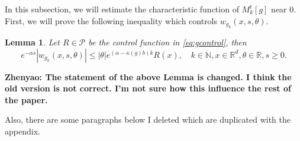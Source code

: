 \documentclass[12pt, a4paper]{amsart}
\newtheorem{lem}[thm]{Lemma}
\theoremstyle{definition}
\numberwithin{equation}{section}
\begin{document}
In this subsection, we will estimate the characteristic function of $M_k^t[g]$ near $0$. First, we will prove the following inequality which controls $w_{g_k}(x,s,\theta)$.
\begin{lem}\label{lemma1}
    Let $R \in \mathcal P$ be the control function in \eqref{eq:gcontrol}, then
\begin{equation}
    e^{-\alpha s}|w_{g_k}(x,s,\theta)|
    \leq |\theta|e^{(\alpha-\kappa(g)b)k} R(x), 
    \quad k\in \mathbb N, x\in \mathbb R^d, \theta \in \mathbb R, s\geq 0.
\end{equation}
\end{lem}
    {\bf Zhenyao: The statement of the above Lemma is changed. I think the old version is not correct. I'm not sure how this influence the rest of the paper.

    Also, there are some paragraphs below I deleted which are duplicated with the appendix.}

\end{document}
